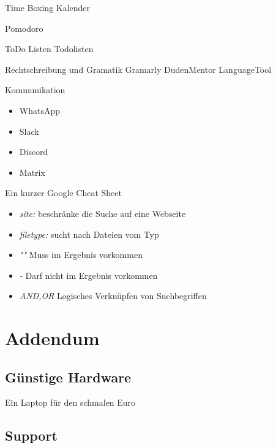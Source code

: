 \documentclass[aspectratio=169,shownotes]{beamer}
\begin{document}
\begin{frame}{Time Boxing}
    Kalender   
    
    Pomodoro
\end{frame}

\begin{frame}{ToDo Listen}
    Todolisten
\end{frame}

\begin{frame}{Rechtschreibung und Gramatik}
    Gramarly
    DudenMentor
    LanguageTool
\end{frame}

\begin{frame}{Kommunikation}
    \begin{itemize}
        \item WhatsApp
        \item Slack
        \item Discord
        \item Matrix        
    \end{itemize}
\end{frame}

\begin{frame}{Ein kurzer Google Cheat Sheet}
    \begin{itemize}
        \item \textit{site:} beschränke die Suche auf eine Webseite
        \item \textit{filetype:} sucht nach Dateien vom Typ
        \item \textit{""}  Muss im Ergebnis vorkommen
        \item \textit{-} Darf nicht im Ergebnis vorkommen
        \item \textit{AND,OR} Logisches Verknüpfen von Suchbegriffen
    \end{itemize}
\end{frame}


\section{Addendum}
\subsection{Günstige Hardware}
\begin{frame}{Ein Laptop für den schmalen Euro}
    
\end{frame}

\subsection{Support}
\end{document}
